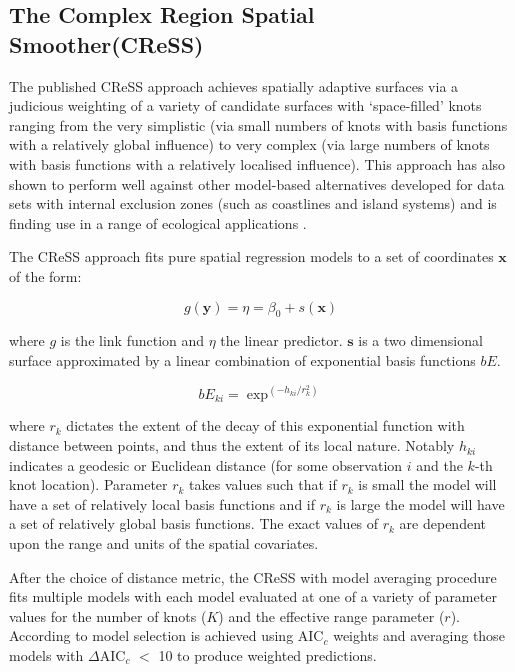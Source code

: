 \documentclass[letterpaper]{interact}
\begin{document}
\subsection{The Complex Region Spatial Smoother(CReSS)}\label{the-complex-region-spatial-smoother-cress}

The published CReSS approach \cite{scott2014} achieves spatially adaptive surfaces via a judicious weighting of a variety of candidate surfaces with `space-filled' knots \cite{Johnson1990} ranging from the very simplistic (via small numbers of knots with basis functions with a relatively global influence) to very complex (via large numbers of knots with basis functions with a relatively localised influence). This approach has also shown to perform well against other model-based alternatives developed for data sets with internal exclusion zones (such as coastlines and island systems) and is finding use in a range of ecological applications \cite{russell2016, dunlop2017, harris2018}.

The CReSS approach fits pure spatial regression models to a set of coordinates $\mathbf{x}$ of the form:

\begin{equation}\label{eqmodframework}
    g(\mathbf{y}) = \eta = \beta_0 + s(\mathbf{x})
\end{equation}

where $g$ is the link function and $\eta$ the linear predictor. $\mathbf{s}$ is a two dimensional surface approximated by a linear combination of exponential basis functions \(bE\). 

\begin{equation}\label{eqexp}
bE_{ki} = \exp^{(-h_{ki}/r_k^{2})}
\end{equation}

where \(r_k\) dictates the extent of the decay of this exponential function with distance between points, and thus the extent of its local nature. Notably \(h_{ki}\) indicates a geodesic or Euclidean distance (for some observation \(i\) and the \(k\)-th knot location). Parameter \(r_{k}\) takes values such that if \(r_k\) is small the model will have a set of relatively local basis functions and if \(r_k\) is large the model will have a set of relatively global basis functions. The exact values of \(r_k\) are dependent upon the range and units of the spatial covariates.

After the choice of distance metric, the CReSS with model averaging procedure fits multiple models with each model evaluated at one of a variety of parameter values for the number of knots (\(K\)) and the effective range parameter (\(r\)). According to \citet{scott2014} model selection is achieved using AIC\(_c\) \cite{sugiura1978} weights and averaging those models with \(\Delta\)AIC\(_c\) \(<\) 10 to produce weighted predictions.
\end{document}
